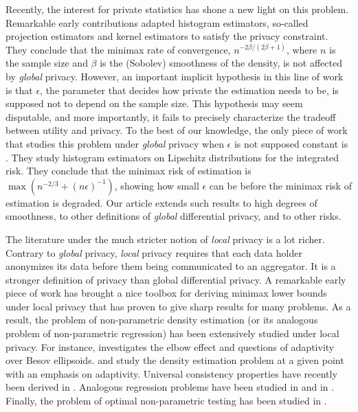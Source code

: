 \documentclass[10pt]{article} %
\newcommand\p[1]{\left( {#1}\right)}
\begin{document}
Recently, the interest for private statistics has shone a new light on this problem. Remarkable early contributions \citep{wasserman2010statistical,hall2013differential} adapted histogram estimators, so-called projection estimators and kernel estimators to satisfy the privacy constraint. They conclude that the minimax rate of convergence, $n^{- 2 \beta/(2 \beta + 1)}$, where $n$ is the sample size and $\beta$ is the (Sobolev) smoothness of the density, is not affected by \emph{global} privacy. However, an important implicit hypothesis in this line of work is that $\epsilon$, the parameter that decides how private the estimation needs to be, is supposed not to depend on the sample size. This hypothesis may seem disputable, and more importantly, it fails to precisely characterize the tradeoff between utility and privacy. To the best of our knowledge, the only piece of work that studies this problem under \emph{global} privacy when $\epsilon$ is not supposed constant is \citet{barber2014privacy}. They study histogram estimators on Lipschitz distributions for the integrated risk. They conclude that the minimax risk of estimation is $\max \p{n^{-2/3} + (n\epsilon)^{-1}}$, showing how small $\epsilon$ can be before the minimax risk of estimation is degraded. Our article extends such results to high degrees of smoothness, to other definitions of \emph{global} differential privacy, and to other risks.

The literature under the much stricter notion of \emph{local} privacy is a lot richer. Contrary to \emph{global} privacy, \emph{local} privacy requires that each data holder anonymizes its data before them being communicated to an aggregator. It is a stronger definition of privacy than global differential privacy. A remarkable early piece of work \cite{duchi2018minimax} has brought a nice toolbox for deriving minimax lower bounds under local privacy that has proven to give sharp results for many problems. As a result, the problem of non-parametric density estimation (or its analogous problem of non-parametric regression) has been extensively studied under local privacy. For instance, \citet{butucea2020local} investigates the elbow effect and questions of adaptivity over Besov ellipsoids. \citet{kroll2021density} and \citet{schluttenhofer2022adaptive} study the density estimation problem at a given point with an emphasis on adaptivity. Universal consistency properties have recently been derived in \citet{gyorfi2023multivariate}. Analogous regression problems have been studied in \citet{berrett2021strongly} and in \citet{gyorfi2022rate}. Finally, the problem of optimal non-parametric testing has been studied in \citet{lam2022minimax}.
\end{document}
